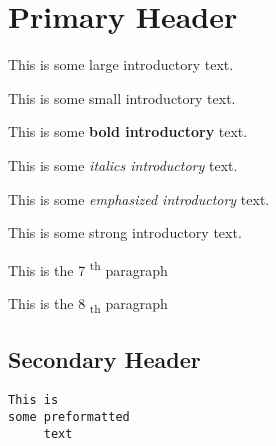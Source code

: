 \documentclass[12pt]{article}
\begin{document}
\section{Primary Header}
This is some {\Large large introductory} text. \par
This is some {\scriptsize small introductory} text. \par
This is some \textbf{ bold introductory} text. \par
This is some \textit{ italics introductory} text. \par
This is some \emph{ emphasized introductory} text. \par
This is some \textmd{ strong introductory} text. \par
This is the 7\textsuperscript{ th} paragraph \par
This is the 8\textsubscript{ th} paragraph \par
\subsection{Secondary Header}
\begin{verbatim}
This is
some preformatted
     text
\end{verbatim}
\end{document}
